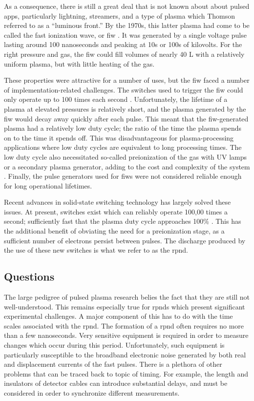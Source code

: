 As a consequence, there is still a great deal that is not known about about
pulsed \acs{app}s, particularly lightning, streamers, and a type of plasma which
Thomson referred to as a ``luminous front.'' By the 1970s, this latter plasma
had come to be called the fast ionization wave, or \acs{fiw}
\cite{Vasilyak1994}. It was generated by a single voltage pulse lasting around
100 nanoseconds and peaking at 10s or 100s of kilovolts. For the right pressure
and gas, the \acs{fiw} could fill volumes of nearly 40 L with a relatively
uniform plasma, but with little heating of the gas.

These properties were attractive for a number of uses, but the \acs{fiw} faced a
number of implementation-related challenges. The switches used to trigger the
\acs{fiw} could only operate up to 100 times each second
\cite{Starikovskaia2001}. Unfortunately, the lifetime of a plasma at elevated
pressures is relatively short, and the plasma generated by the \acs{fiw} would
decay away quickly after each pulse. This meant that the \acs{fiw}-generated
plasma had a relatively low duty cycle; the ratio of the time the plasma spends
on to the time it spends off. This was disadvantageous for plasma-processing
applications where low duty cycles are equivalent to long processing times. The
low duty cycle also necessitated so-called preionization of the gas with UV
lamps or a secondary plasma generator, adding to the cost and complexity of the
system \cite{Levatter1980}. Finally, the pulse generators used for \acs{fiw}s
were not considered reliable enough for long operational lifetimes.

Recent advances in solid-state switching technology has largely solved these
issues. At present, switches exist which can reliably operate 100,00 times a
second; sufficiently fast that the plasma duty cycle approaches 100\%
\cite{Efanov1997}. This has the additional benefit of obviating the need for a
preionization stage, as a sufficient number of electrons persist between pulses.
The discharge produced by the use of these new switches is what we refer to as
the \acs{rpnd}.

\subsection{Questions}

The large pedigree of pulsed plasma research belies the fact that they are still
not well-understood. This remains especially true for \acs{rpnd}s which present
significant experimental challenges. A major component of this has to do with
the time scales associated with the \acs{rpnd}. The formation of a \acs{rpnd}
often requires no more than a few nanoseconds. Very sensitive equipment is
required in order to measure changes which occur during this period.
Unfortunately, such equipment is particularly susceptible to the broadband
electronic noise generated by both real and displacement currents of the fast
pulses. There is a plethora of other problems that can be traced back to topic
of timing. For example, the length and insulators of detector cables can
introduce substantial delays, and must be considered in order to synchronize
different measurements.

